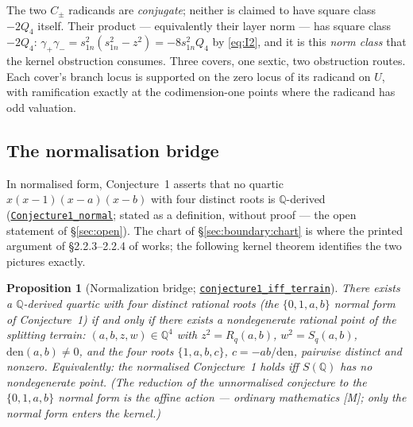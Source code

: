 \documentclass[11pt]{amsart}
\newtheorem{proposition}[theorem]{Proposition}
\newcommand{\Q}{\mathbb{Q}}
\newcommand{\repourl}{https://github.com/hirokifukui/rd-quartics-classification}
\newcommand{\repotag}{v1.1.0}
\newcommand{\leanline}[3]{\href{\repourl/blob/\repotag/#1\#L#2}{\texttt{#3}}}
\begin{document}
\noindent The two $C_{\pm}$ radicands are \emph{conjugate}; neither is
claimed to have square class $-2Q_{4}$ itself.  Their product ---
equivalently their layer norm --- has square class $-2Q_{4}$:
$\gamma_{+}\gamma_{-}=s_{1n}^{2}(s_{1n}^{2}-z^{2})=-8s_{1n}^{2}Q_{4}$
by \eqref{eq:I2}, and it is this \emph{norm class} that the kernel
obstruction consumes.  Three covers, one sextic, two obstruction
routes.  Each cover's branch locus is supported on the zero locus of
its radicand on $U$, with ramification exactly at the codimension-one
points where the radicand has odd valuation.

\subsection{The normalisation bridge}\label{sec:boundary:bridge}

In normalised form, Conjecture~1 asserts that no quartic
$x(x-1)(x-a)(x-b)$ with four distinct roots is $\Q$-derived
(\leanline{Gap/BMThm7Transcript.lean}{996}{Conjecture1\_normal};
stated as a definition, without proof --- the open statement of
\S\ref{sec:open}).  The chart of \S\ref{sec:boundary:chart} is where
the printed argument of \S2.2.3--2.2.4 of \cite{BM2000} works; the
following kernel theorem identifies the two pictures exactly.

\begin{proposition}[Normalization bridge;
\leanline{Gap/BMThm7Terrain.lean}{394}{conjecture1\_iff\_terrain}]
\label{prop:bridge}
There exists a $\Q$-derived quartic with four distinct rational roots
(the $\{0,1,a,b\}$ normal form of Conjecture~1) if and only if there
exists a nondegenerate rational point of the splitting terrain:
$(a,b,z,w)\in\Q^{4}$ with $z^{2}=R_{q}(a,b)$, $w^{2}=S_{q}(a,b)$,
$\mathrm{den}(a,b)\neq0$, and the four roots $\{1,a,b,c\}$,
$c=-ab/\mathrm{den}$, pairwise distinct and nonzero.  Equivalently:
the normalised Conjecture~1 holds iff $S(\Q)$ has no nondegenerate
point.  (The reduction of the unnormalised conjecture to the
$\{0,1,a,b\}$ normal form is the affine action --- ordinary
mathematics [M]; only the normal form enters the kernel.)
\end{proposition}
\end{document}
